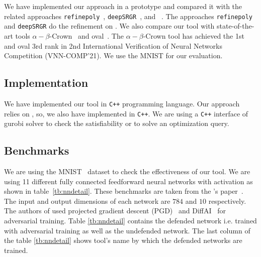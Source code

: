 We have implemented our approach in a prototype and compared it with the related 
approaches \texttt{refinepoly}~\cite{singh2019beyond}, \texttt{deepSRGR}~\cite{yang2021improving}, and \deeppoly{}~\cite{singh2019abstract}. 
The approaches  \texttt{refinepoly} and \texttt{deepSRGR} do the refinement on \deeppoly{}. We also compare 
our tool with state-of-the-art tools $\alpha - \beta$-Crown~\cite{alphabetacrown} and oval~\cite{ovaltool}. 
The $\alpha - \beta$-Crown tool has achieved the 1st and oval 3rd rank in
2nd International Verification of Neural Networks Competition (VNN-COMP'21). 
We use the MNIST \cite{deng2012mnist} for our evaluation.    
\subsection{Implementation}
We have implemented our tool in \texttt{C++} programming language. Our approach relies on \deeppoly{}, so, 
we also have implemented \deeppoly{} in \texttt{C++}. We are using a \texttt{C++} interface of gurobi solver 
to check the satisfiability or to solve an optimization query. 

\subsection{Benchmarks}
We are using the MNIST~\cite{deng2012mnist} dataset to check the effectiveness of our tool. 
We are using 11 different fully connected feedforward neural networks with \relu{} activation as shown in table~\ref{tb:nndetail}.
These benchmarks are taken from the \deeppoly{}'s paper~\cite{singh2019abstract}. 
The input and output dimensions of each network are $784$ and $10$ respectively. 
The authors of \deeppoly{} used projected gradient descent (PGD)~\cite{dong2018boosting}
and DiffAI~\cite{mirman2018differentiable} for adversarial training. Table \ref{tb:nndetail} contains the defended network i.e.
trained with adversarial training as well as the undefended network. The last column of the table \ref{tb:nndetail}
shows tool's name by which the defended networks are trained.  


